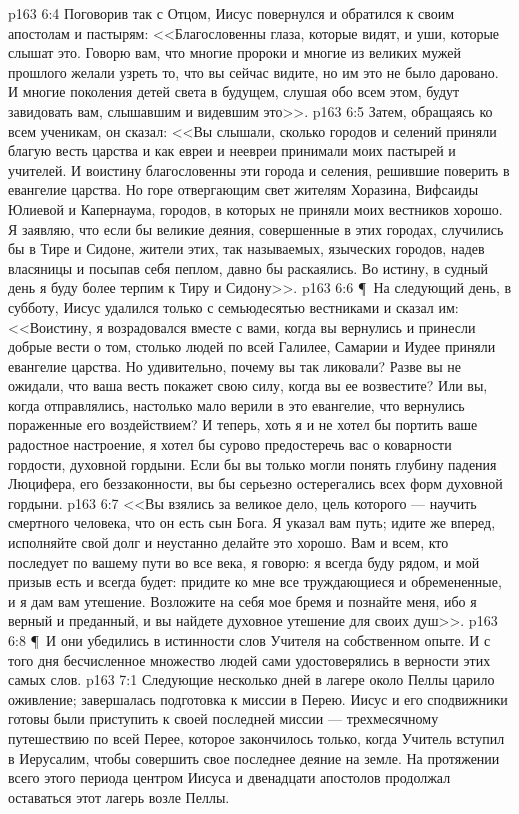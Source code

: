 \vs p163 6:4 Поговорив так с Отцом, Иисус повернулся и обратился к своим апостолам и пастырям: <<Благословенны глаза, которые видят, и уши, которые слышат это. Говорю вам, что многие пророки и многие из великих мужей прошлого желали узреть то, что вы сейчас видите, но им это не было даровано. И многие поколения детей света в будущем, слушая обо всем этом, будут завидовать вам, слышавшим и видевшим это>>.
\vs p163 6:5 Затем, обращаясь ко всем ученикам, он сказал: <<Вы слышали, сколько городов и селений приняли благую весть царства и как евреи и неевреи принимали моих пастырей и учителей. И воистину благословенны эти города и селения, решившие поверить в евангелие царства. Но горе отвергающим свет жителям Хоразина, Вифсаиды Юлиевой и Капернаума, городов, в которых не приняли моих вестников хорошо. Я заявляю, что если бы великие деяния, совершенные в этих городах, случились бы в Тире и Сидоне, жители этих, так называемых, языческих городов, надев власяницы и посыпав себя пеплом, давно бы раскаялись. Во истину, в судный день я буду более терпим к Тиру и Сидону>>.
\vs p163 6:6 \P\ На следующий день, в субботу, Иисус удалился только с семьюдесятью вестниками и сказал им: <<Воистину, я возрадовался вместе с вами, когда вы вернулись и принесли добрые вести о том, столько людей по всей Галилее, Самарии и Иудее приняли евангелие царства. Но удивительно, почему вы так ликовали? Разве вы не ожидали, что ваша весть покажет свою силу, когда вы ее возвестите? Или вы, когда отправлялись, настолько мало верили в это евангелие, что вернулись пораженные его воздействием? И теперь, хоть я и не хотел бы портить ваше радостное настроение, я хотел бы сурово предостеречь вас о коварности гордости, духовной гордыни. Если бы вы только могли понять глубину падения Люцифера, его беззаконности, вы бы серьезно остерегались всех форм духовной гордыни.
\vs p163 6:7 <<Вы взялись за великое дело, цель которого --- научить смертного человека, что он есть сын Бога. Я указал вам путь; идите же вперед, исполняйте свой долг и неустанно делайте это хорошо. Вам и всем, кто последует по вашему пути во все века, я говорю: я всегда буду рядом, и мой призыв есть и всегда будет: придите ко мне все труждающиеся и обремененные, и я дам вам утешение. Возложите на себя мое бремя и познайте меня, ибо я верный и преданный, и вы найдете духовное утешение для своих душ>>.
\vs p163 6:8 \P\ И они убедились в истинности слов Учителя на собственном опыте. И с того дня бесчисленное множество людей сами удостоверялись в верности этих самых слов.
\vs p163 7:1 Следующие несколько дней в лагере около Пеллы царило оживление; завершалась подготовка к миссии в Перею. Иисус и его сподвижники готовы были приступить к своей последней миссии --- трехмесячному путешествию по всей Перее, которое закончилось только, когда Учитель вступил в Иерусалим, чтобы совершить свое последнее деяние на земле. На протяжении всего этого периода центром Иисуса и двенадцати апостолов продолжал оставаться этот лагерь возле Пеллы.
